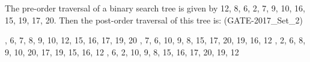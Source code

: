 \begin{questyle}
  \question  The pre-order traversal of a binary search tree is given by
             12, 8, 6, 2, 7, 9, 10, 16, 15, 19, 17, 20. Then the post-order traversal of this tree is:  (GATE-2017\_Set\_2)

  \begin{choices}
    , 6, 7, 8, 9, 10, 12, 15, 16, 17, 19, 20
    , 7, 6, 10, 9, 8, 15, 17, 20, 19, 16, 12
    , 2, 6, 8, 9, 10, 20, 17, 19, 15, 16, 12
    , 6, 2, 10, 9, 8, 15, 16, 17, 20, 19, 12
  \end{choices}
\end{questyle}



\begin{comment}

\begin{questyle}
  \question  zzz  (GATE-zzz)

  \begin{choices}
    \choice         zzz
    \choice         zzz
    \choice         zzz
    \choice         zzz
    \CorrectChoice
  \end{choices}
\end{questyle}

\begin{questyle}
  \question  zzz  (GATE-zzz)

  \begin{choices}
    \choice         zzz
    \choice         zzz
    \choice         zzz
    \choice         zzz
    \CorrectChoice
  \end{choices}
\end{questyle}


\begin{questyle}
  \question  zzz  (GATE-zzz)

  \begin{choices}
    \choice         zzz
    \choice         zzz
    \choice         zzz
    \choice         zzz
    \CorrectChoice
  \end{choices}
\end{questyle}

\begin{questyle}
  \question  zzz  (GATE-zzz)

  \begin{choices}
    \choice         zzz
    \choice         zzz
    \choice         zzz
    \choice         zzz
    \CorrectChoice
  \end{choices}
\end{questyle}

\begin{questyle}
  \question  zzz  (GATE-zzz)

  \begin{choices}
    \choice         zzz
    \choice         zzz
    \choice         zzz
    \choice         zzz
    \CorrectChoice
  \end{choices}
\end{questyle}


\end{comment}
